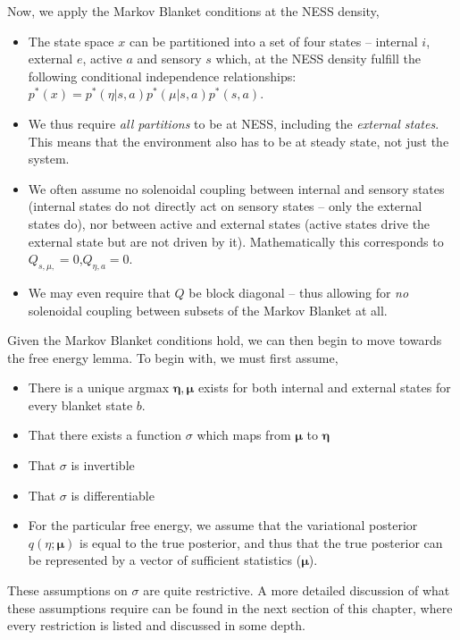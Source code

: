 Now, we apply the Markov Blanket conditions at the NESS density,
\begin{itemize}
  \item The state space $x$ can be partitioned into a set of four states -- internal $i$, external $e$, active $a$ and sensory $s$ which, at the NESS density fulfill the following conditional independence relationships:
  $p^*(x) = p^*(\eta | s,a)p^*(\mu | s,a)p^*(s,a)$.
  \item We thus require \emph{all partitions} to be at NESS, including the \emph{external states}. This means that the environment also has to be at steady state, not just the system.
  \item We often assume no solenoidal coupling between internal and sensory states (internal states do not directly act on sensory states -- only the external states do), nor between active and external states (active states drive the external state but are not driven by it). Mathematically this corresponds to $Q_{s, \mu,} = 0$,$Q_{\eta,a} = 0$. 
  \item We may even require that $Q$ be block diagonal -- thus allowing for \emph{no} solenoidal coupling between subsets of the Markov Blanket at all.
\end{itemize}
Given the Markov Blanket conditions hold, we can then begin to move towards the free energy lemma. To begin with, we must first assume,
\begin{itemize}
  \item There is a unique argmax $\bm{\eta}, \bm{\mu}$ exists for both internal and external states for every blanket state $b$.
  \item That there exists a function $\sigma$ which maps from $\bm{\mu}$ to $\bm{\eta}$
  \item That $\sigma$ is invertible
  \item That $\sigma$ is differentiable  
  \item For the particular free energy, we assume that the variational posterior $q(\eta ; \bm{\mu})$ is equal to the true posterior, and thus that the true posterior can be represented by a vector of sufficient statistics ($\bm{\mu}$).
\end{itemize}
These assumptions on $\sigma$ are quite restrictive. A more detailed discussion of what these assumptions require can be found in the next section of this chapter, where every restriction is listed and discussed in some depth.

